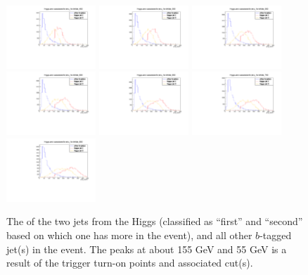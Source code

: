 \begin{figure}[H]
    \includegraphics[width=0.3\textwidth]{SignalKin/jet_pt_compare_bAbb_450.pdf}
    \newline
    \includegraphics[width=0.3\textwidth]{SignalKin/jet_pt_compare_bAbb_500.pdf}
    \includegraphics[width=0.3\textwidth]{SignalKin/jet_pt_compare_bAbb_550.pdf}
    \includegraphics[width=0.3\textwidth]{SignalKin/jet_pt_compare_bAbb_600.pdf}
    \newline
    \includegraphics[width=0.3\textwidth]{SignalKin/jet_pt_compare_bAbb_650.pdf}
    \includegraphics[width=0.3\textwidth]{SignalKin/jet_pt_compare_bAbb_700.pdf}
    \includegraphics[width=0.3\textwidth]{SignalKin/jet_pt_compare_bAbb_800.pdf}
    \caption{The \pt of the two jets from the Higgs (classified as ``first'' and ``second'' based
    on which one has more \pt in the event), and all other $b$-tagged jet(s) in the event.
    The peaks at about 155 GeV and 55 GeV is a result of the trigger turn-on points and
    associated cut(s).  \label{fig:pt_higgs_and_associated_jets}}
\end{figure}
